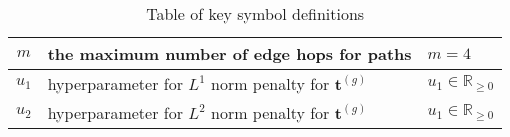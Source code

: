 \documentclass[11pt,notitlepage,english]{article}
\begin{document}
\begin{table}[!htb]
\begin{center}
{\begin{tabular}{cll}
      $m$ & the maximum number of edge hops for paths & $m=4$ \\\midrule
      $u_1$ & hyperparameter for $L^1$ norm penalty for ${\boldsymbol t}^{(g)}$ & $u_1 \in {\mathbb R}_{\geq 0}$ \\\midrule
      $u_2$ & hyperparameter for $L^2$ norm penalty for ${\boldsymbol t}^{(g)}$ & $u_1 \in {\mathbb R}_{\geq 0}$ \\\midrule
    \end{tabular}
    }
  \end{center}
  \caption{Table of key symbol definitions}\label{table:symboldefs}
\end{table}
\end{document}
